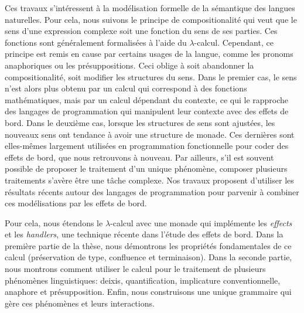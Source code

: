 \begin{ThesisAbstract}
  \begin{FrenchAbstract}

    Ces travaux s’intéressent à la modélisation formelle de la sémantique
    des langues naturelles. Pour cela, nous suivons le principe de
    compositionalité qui veut que le sens d’une expression complexe soit
    une fonction du sens de ses parties. Ces fonctions sont généralement
    formalisées à l’aide du $\lambda$-calcul. Cependant, ce principe est
    remis en cause par certains usages de la langue, comme les pronoms
    anaphoriques ou les présuppositions. Ceci oblige à soit abandonner la
    compositionalité, soit modifier les structures du sens. Dans le premier
    cas, le sens n’est alors plus obtenu par un calcul qui correspond à des
    fonctions mathématiques, mais par un calcul dépendant du contexte, ce
    qui le rapproche des langages de programmation qui manipulent leur
    contexte avec des effets de bord. Dans le deuxième cas, lorsque les
    structures de sens sont ajustées, les nouveaux sens ont tendance à
    avoir une structure de monade. Ces dernières sont elles-mêmes largement
    utilisées en programmation fonctionnelle pour coder des effets de bord,
    que nous retrouvons à nouveau. Par ailleurs, s’il est souvent possible
    de proposer le traitement d’un unique phénomène, composer plusieurs
    traitements s’avère être une tâche complexe. Nos travaux proposent
    d’utiliser les résultats récents autour des langages de programmation
    pour parvenir à combiner ces modélisations par les effets de bord.

    Pour cela, nous étendons le $\lambda$-calcul avec une monade qui
    implémente les \textit{effects} et les \textit{handlers}, une technique
    récente dans l’étude des effets de bord. Dans la première partie de la
    thèse, nous démontrons les propriétés fondamentales de ce calcul
    (préservation de type, confluence et terminaison). Dans la seconde
    partie, nous montrons comment utiliser le calcul pour le traitement de
    plusieurs phénomènes linguistiques: deixis, quantification, implicature
    conventionnelle, anaphore et présupposition. Enfin, nous construisons
    une unique grammaire qui gère ces phénomènes et leurs interactions.
    
  \end{FrenchAbstract}


\end{ThesisAbstract}
